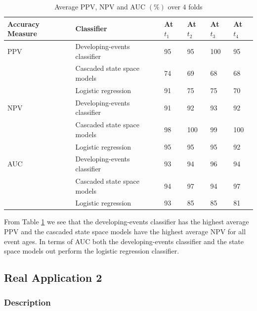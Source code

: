 \documentclass[a4paper,11pt]{article}
\begin{document}
\begin{table}[H]
	\centering
	\caption{Average PPV, NPV and AUC $(\%)$ over $4$ folds }
	\footnotesize
	\begin{tabular}{p{1.5cm}p{6cm}p{1cm}p{1cm}p{1cm}p{1cm}}
		\toprule
		Accuracy Measure & Classifier                   & At $t_1$ & At $t_2$ & At $t_3$ & At $t_4$ \\
		\midrule
		PPV              & Developing-events classifier & 95       & 95       & 100      & 95       \\
		                 & Cascaded state space models  & 74       & 69       & 68       & 68       \\
		                 & Logistic regression          & 91       & 75       & 75       & 70       \\
		\hline
		NPV              & Developing-events classifier & 91       & 92       & 93       & 92       \\
		                 & Cascaded state space models  & 98       & 100      & 99       & 100      \\
		                 & Logistic regression          & 95       & 95       & 95       & 92       \\
		\hline
		AUC              & Developing-events classifier & 93       & 94       & 96       & 94       \\
		                 & Cascaded state space models  & 94       & 97       & 94       & 97       \\
		                 & Logistic regression          & 93       & 85       & 85       & 81       \\
		\bottomrule
	\end{tabular}
	\label{tab:AverageAccuracyReal}
\end{table}

From Table \ref{tab:AverageAccuracyReal} we see that the developing-events classifier has the highest average PPV and the cascaded state space models have the highest average NPV for all event ages. In terms of AUC both the developing-events classifier and the state space models out perform the logistic regression classifier.

\subsection{Real Application 2}

\subsubsection{Description}
\end{document}
